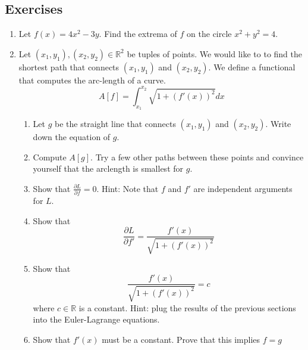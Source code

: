 \documentclass[book.tex]{subfiles}
\begin{document}
\subsection{Exercises}
\begin{enumerate}
    \item Let $f(x) = 4x^2 - 3y$. Find the extrema of $f$ on the circle $x^2 + y^2 = 4$.
    \item Let $(x_1, y_1), (x_2, y_2) \in \mathbb{R}^2$ be tuples of points. We would like to to find the shortest path that connects $(x_1, y_1)$ and $(x_2, y_2)$. We define a functional that computes the arc-length of a curve.
    \begin{equation}
        A[f] = \int_{x_1}^{x_2} \sqrt{1 + (f'(x))^2} dx
    \end{equation}
    \begin{enumerate}
        \item Let $g$ be the straight line that connects $(x_1, y_1)$ and $(x_2, y_2)$. Write down the equation of $g$.
        \item Compute $A[g]$. Try a few other paths between these points and convince yourself that the arclength is smallest for $g$. 
        \item Show that $\frac{\partial L}{\partial f} = 0$. Hint: Note that $f$ and $f'$ are independent arguments for $L$.
        \item Show that 
        \begin{equation}
            \frac{\partial L}{\partial f'} = \frac{f'(x)}{\sqrt{1 + (f'(x))^2}}
        \end{equation}
        \item Show that 
        \begin{equation}
            \frac{f'(x)}{\sqrt{1 + (f'(x))^2}} = c
        \end{equation}
        where $c \in \mathbb{R}$ is a constant. Hint: plug the results of the previous sections into the Euler-Lagrange equations.
        \item Show that $f'(x)$ must be a constant. Prove that this implies $f = g$
    \end{enumerate}
\end{enumerate}
\end{document}
